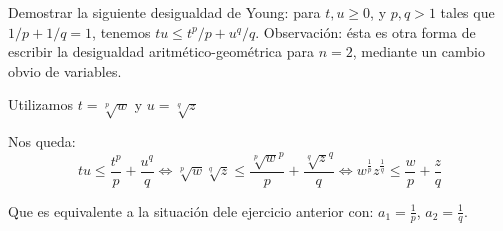 \begin{problem}[2] Demostrar la siguiente desigualdad de Young: para $t, u \ge 0$, y $p,q > 1$ tales que
$1/p + 1/q =1$, tenemos $tu \le t^p/ p + u^q/ q$. Observaci\'on: \'esta es otra forma de
escribir la  desigualdad aritm\'etico-geom\'etrica para $n=2$, mediante un cambio obvio de variables.
\solution

\begin{expla}
Utilizamos $t=\sqrt[p]{w}$ y $u=\sqrt[q]{z}$
\end{expla}
Nos queda:
\[
tu\leq\frac{t^p}{p}+\frac{u^q}{q} \Leftrightarrow \sqrt[p]{w}\sqrt[q]{z} \leq \frac{\sqrt[p]{w}^p}{p} + \frac{\sqrt[q]{z}^q}{q} \Leftrightarrow w^{\frac{1}{p}} z^{\frac{1}{q}}\leq\frac{w}{p}+\frac{z}{q}
\]

Que es equivalente a la situación dele ejercicio anterior con: $a_1=\frac{1}{p}$, $a_2=\frac{1}{q}$. 

\end{problem}


